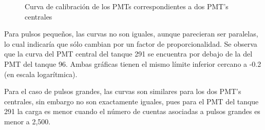 \documentclass[11pt]{article}
\begin{document}
\begin{figure}[H]
\centering
{}

\caption{Curva de calibración de los PMTs correspondientes a dos PMT's centrales}
\label{fig:Prob2}
\end{figure}
Para pulsos pequeños, las curvas no son iguales, aunque parecieran ser paralelas, lo cual indicaría que sólo cambian por un factor de proporcionalidad. Se observa que la curva del PMT central del tanque 291 se encuentra por debajo de la del PMT del tanque 96. Ambas gráficas tienen el mismo límite inferior cercano a -0.2 (en escala logarítmica).

\hspace{5mm}Para el caso de pulsos grandes, las curvas son similares para los dos PMT's centrales, sin embargo no son exactamente iguales, pues para el PMT del tanque 291 la carga es menor cuando el número de cuentas asociadas a pulsos grandes es menor a 2,500.
\pagebreak
\end{document}
